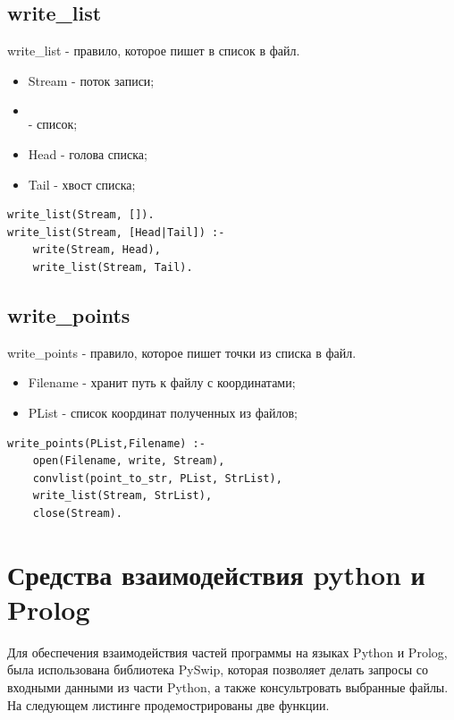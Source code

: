 \subsection{write\_list}
\hspace{0.6cm} write\_list - правило, которое пишет в список в файл.

\begin{itemize}
	\item Stream - поток записи;
	\item \[\] - список;
	\item Head - голова списка;
	\item Tail - хвост списка;
\end{itemize}

\begin{lstlisting}[caption=Реализация правила write\_list, label=rules:writelist]
write_list(Stream, []).
write_list(Stream, [Head|Tail]) :-
	write(Stream, Head),
	write_list(Stream, Tail).
\end{lstlisting}

\subsection{write\_points} 
\hspace{0.6cm} write\_points - правило, которое пишет точки из списка в файл.

\begin{itemize}
	\item Filename - хранит путь к файлу с координатами;
	\item PList - список координат полученных из файлов;
\end{itemize}

\begin{lstlisting}[caption=Реализация правила write\_points, label=rules:writepoints]
write_points(PList,Filename) :-
    open(Filename, write, Stream),
    convlist(point_to_str, PList, StrList),
	write_list(Stream, StrList),
    close(Stream).
\end{lstlisting}

\section{Средства взаимодействия python и Prolog}

\hspace{0.6cm}Для обеспечения взаимодействия частей программы на языках Python и Prolog, была использована библиотека PySwip, которая позволяет делать запросы со входными данными из части Python, а также консультровать выбранные файлы. На следующем листинге продемострированы две функции.

